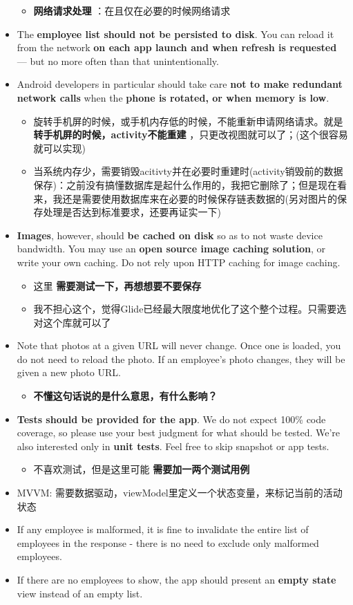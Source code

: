 \documentclass[9pt, b5paper]{article}
\begin{document}
\begin{itemize}
\begin{itemize}
\item \textbf{网络请求处理} ：在且仅在必要的时候网络请求
\end{itemize}
\item The \textbf{employee list should not be persisted to disk}. You can reload it from the network \textbf{on each app launch and when refresh is requested} — but no more often than that unintentionally.
\item Android developers in particular should take care \textbf{not to make redundant network calls} when the \textbf{phone is rotated, or when memory is low}.
\begin{itemize}
\item 旋转手机屏的时候，或手机内存低的时候，不能重新申请网络请求。就是 \textbf{转手机屏的时候，activity不能重建} ，只更改视图就可以了；(这个很容易就可以实现)
\item 当系统内存少，需要销毁acitivty并在必要时重建时(activity销毁前的数据保存)：之前没有搞懂数据库是起什么作用的，我把它删除了；但是现在看来，我还是需要使用数据库来在必要的时候保存链表数据的(另对图片的保存处理是否达到标准要求，还要再证实一下)
\end{itemize}
\item \textbf{Images}, however, should \textbf{be cached on disk} so as to not waste device bandwidth. You may use an \textbf{open source image caching solution}, or write your own caching. Do not rely upon HTTP caching for image caching.
\begin{itemize}
\item 这里 \textbf{需要测试一下，再想想要不要保存}
\item 我不担心这个，觉得Glide已经最大限度地优化了这个整个过程。只需要选对这个库就可以了
\end{itemize}
\item Note that photos at a given URL will never change. Once one is loaded, you do not need to reload the photo. If an employee’s photo changes, they will be given a new photo URL.
\begin{itemize}
\item \textbf{不懂这句话说的是什么意思，有什么影响？}
\end{itemize}
\item \textbf{Tests should be provided for the app}. We do not expect 100\% code coverage, so please use your best judgment for what should be tested. We’re also interested only in \textbf{unit tests}. Feel free to skip snapshot or app tests.
\begin{itemize}
\item 不喜欢测试，但是这里可能 \textbf{需要加一两个测试用例}
\end{itemize}
\item MVVM: 需要数据驱动，viewModel里定义一个状态变量，来标记当前的活动状态
\item If any employee is malformed, it is fine to invalidate the entire list of employees in the response - there is no need to exclude only malformed employees.
\item If there are no employees to show, the app should present an \textbf{empty state} view instead of an empty list.
\end{itemize}
\end{document}
